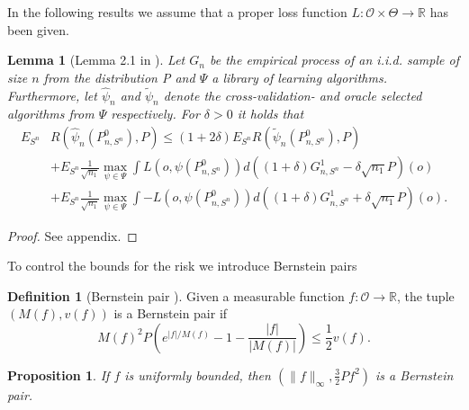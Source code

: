 \documentclass[11pt, a4paper]{article}
\newcommand\norm[1]{\lVert#1\rVert}
\newtheorem{proposition}[theorem]{Proposition}
\newtheorem{lemma}[theorem]{Lemma}
\theoremstyle{definition}
\newtheorem{definition}[theorem]{Definition}
\theoremstyle{remark}
\newcommand{\la}{\psi}
\newcommand{\Sn}{S^n}
\newcommand{\lib}{\Psi}
\begin{document}
In the following results we assume that a proper loss function $ L: \mathcal{O} \times \Theta \to \mathbb{R} $ has been given.  
\begin{lemma}[Lemma 2.1 in \parencite{vaart06}] \label{finitesampledecomp}
    Let $ G_{n} $ be the empirical process of an i.i.d. sample of size $ n $ from the distribution P and $ \lib$ a library of learning algorithms. Furthermore, let $ \hat{\la}_n  $ and $ \tilde{\la}_n $ denote the cross-validation- and oracle selected algorithms from $ \lib $ respectively. For $ \delta > 0 $ it holds that
   \begin{align*}
       E_{\Sn} &R( \hat{\la}_n(P_{n, \Sn}^{0}), P) \leq (1 + 2 \delta) E_{\Sn} R( \tilde{\la}_n(P_{n, \Sn}^{0}) , P ) \\ 
                                                                &+E_{\Sn} \frac{1}{\sqrt{n_1} } \max_{\la \in \lib} \int L(o, \la(P_{n, \Sn}^{0})) d ((1 + \delta) G_{n,\Sn}^{1} - \delta \sqrt{n_1} P)(o)  \\
                                                                &+E_{\Sn} \frac{1}{\sqrt{n_1} } \max_{\la \in \lib} \int-L(o, \la(P_{n, \Sn}^{0})) d ((1 + \delta) G_{n,\Sn}^{1} + \delta \sqrt{n_1} P)(o).
   \end{align*}
\end{lemma}
\begin{proof}
    See appendix.
\end{proof}
To control the bounds for the risk we introduce Bernstein pairs 
\begin{definition}[Bernstein pair \parencite{vaart06}]
    Given a measurable function $ f: \mathcal{O} \to \mathbb{R} $, the tuple $ (M(f) , v(f)) $ is a Bernstein pair if 
    \begin{equation} \label{bernstein}
        M(f)^2 P\left( e^{|f|/M(f)} -1 - \frac{|f|}{|M(f)|}\right) \leq \frac{1}{2}v(f). 
    \end{equation}
\end{definition}
\begin{proposition} \label{unifbernstein}
    If $ f $ is uniformly bounded, then $ (\norm{f}_{\infty}, \frac{3}{2} Pf^2 ) $ is a Bernstein pair. 
\end{proposition}
\end{document}
